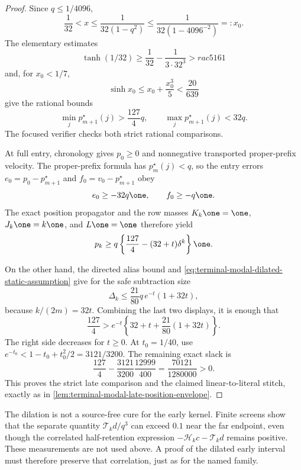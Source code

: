 \begin{proof}
Since $q\le1/4096$,
\[
 \frac1{32}<x\le\frac1{32(1-q^2)}
 \le\frac1{32(1-4096^{-2})}=:x_0.
\]
The elementary estimates
\[
 \tanh(1/32)\ge\frac1{32}-\frac1{3\cdot32^3}>rac5{161}
\]
and, for $x_0<1/7$,
\[
 \sinh x_0\le x_0+\frac{x_0^3}{5}<\frac{20}{639}
\]
give the rational bounds
\begin{equation}
 \min_jp_{m+1}^\star(j)>\frac{127}{4}q,
 \qquad
 \max_jp_{m+1}^\star(j)<32q.
 \label{eq:terminal-modal-dilated-optimum-bounds}
\end{equation}
The focused verifier checks both strict rational comparisons.

At full entry, chronology gives $p_0\ge0$ and nonnegative transported
proper-prefix velocity.  The proper-prefix formula has
$p_m^\star(j)<q$, so the entry errors
$e_0=p_0-p_{m+1}^\star$ and $f_0=v_0-p_{m+1}^\star$ obey
\[
 e_0\ge-32q\one,\qquad f_0\ge-q\one.
\]
The exact position propagator and the row masses
$K_k\one=\one$, $J_k\one=k\one$, and $L\one=\one$ therefore yield
\begin{equation}
 p_k\ge q\left\{\frac{127}{4}-(32+t)\delta^k\right\}\one.
 \label{eq:terminal-modal-dilated-position-lower}
\end{equation}

On the other hand, the directed alias bound and
\eqref{eq:terminal-modal-dilated-static-assumption} give for the safe
subtraction size
\begin{equation}
 \Delta_k\le\frac{21}{80}q\,e^{-t}(1+32t),
 \label{eq:terminal-modal-dilated-envelope-upper}
\end{equation}
because $k/(2m)=32t$.  Combining the last two displays, it is enough that
\begin{equation}
 \frac{127}{4}>
 e^{-t}\left\{32+t+\frac{21}{80}(1+32t)\right\}.
 \label{eq:terminal-modal-dilated-scalar-comparison}
\end{equation}
The right side decreases for $t\ge0$.  At $t_0=1/40$, use
$e^{-t_0}<1-t_0+t_0^2/2=3121/3200$.  The remaining exact slack is
\begin{equation}
 \frac{127}{4}-\frac{3121}{3200}\frac{12999}{400}
 =\frac{70121}{1280000}>0.
\end{equation}
This proves the strict late comparison and the claimed linear-to-literal
stitch, exactly as in
\cref{lem:terminal-modal-late-position-envelope}.
\end{proof}

The dilation is not a source-free cure for the early kernel.  Finite screens
show that the separate quantity $\mathcal T_kd/q^3$ can exceed $0.1$ near
the far endpoint, even though the correlated half-retention expression
$-\mathcal H_kc-\mathcal T_kd$ remains positive.  These measurements are not
used above.  A proof of the dilated early interval must therefore preserve
that correlation, just as for the named family.
